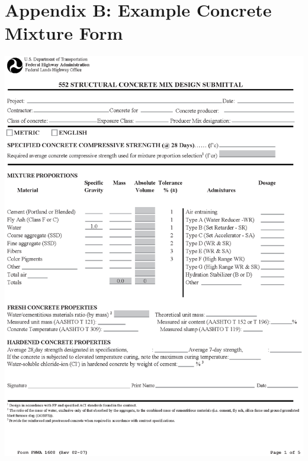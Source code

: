 \documentclass[12pt]{article}
\begin{document}
\section*{Appendix B: Example Concrete Mixture Form}
\label{AppendixB}
\begin{center}
    \includegraphics[width=1\linewidth]{1608_v11_1.eps}
\end{center}


\end{document}
